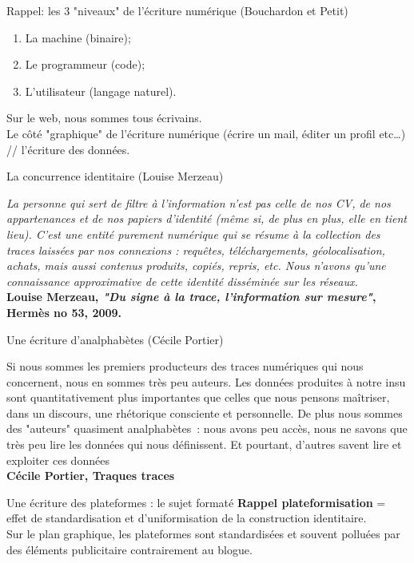 \begin{frame}{Rappel: les 3 "niveaux" de l'écriture numérique (Bouchardon et Petit)}
    \begin{enumerate}
        \item La machine (binaire);
        \item Le programmeur (code);
        \item L'utilisateur (langage naturel).
    \end{enumerate}

\textrightarrow{} Sur le web, nous sommes tous écrivains.\\
\vspace{1em}
Le côté "graphique" de l'écriture numérique (écrire un mail, éditer un profil etc\dots) // l'écriture des données.
\end{frame}

\begin{frame}{La concurrence identitaire (Louise Merzeau)}
    \begin{center}
        {\small
        \textit{La personne qui sert de filtre à l’information n’est pas celle de nos CV, de nos appartenances et de nos papiers d’identité (même si, de plus en plus, elle en tient lieu). C’est une entité purement numérique qui se résume à la collection des traces laissées par nos connexions : requêtes, téléchargements, géolocalisation, achats, mais aussi contenus produits, copiés, repris, etc. Nous n’avons qu’une connaissance approximative de cette identité disséminée sur les réseaux.}}\\
        \textbf{Louise Merzeau, \textit{"Du signe à la trace, l'information sur mesure"}, Hermès no 53, 2009.}
    \end{center}
\end{frame}

\begin{frame}{Une écriture d'analphabètes (Cécile Portier)}
    \begin{center}
        {\small Si nous sommes les premiers producteurs des traces numériques qui nous concernent, nous en sommes très peu auteurs. Les données produites à notre insu sont quantitativement plus importantes que celles que nous pensons maîtriser, dans un discours, une rhétorique consciente et personnelle. De plus nous sommes des "auteurs" quasiment analphabètes : nous avons peu accès, nous ne savons que très peu lire les données qui nous définissent. Et pourtant, d'autres savent lire et exploiter ces données}\\
        \textbf{Cécile Portier, Traques traces}
    \end{center}
\end{frame}

\begin{frame}{Une écriture des plateformes : le sujet formaté}
    \textbf{Rappel plateformisation} = effet de standardisation et d'uniformisation de la construction identitaire.\\
    \vspace{1em}
Sur le plan graphique, les plateformes sont standardisées et souvent polluées par des éléments publicitaire contrairement au blogue.
\end{frame}